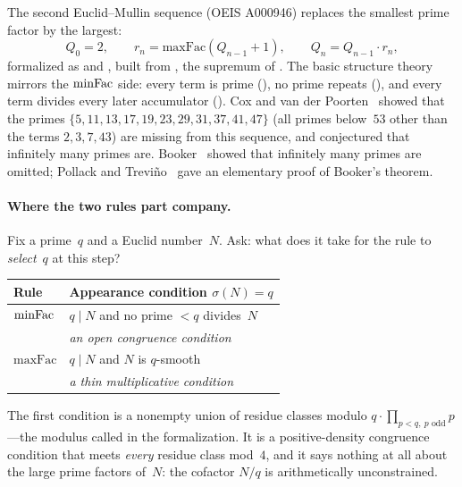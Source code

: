 The second Euclid--Mullin sequence (OEIS A000946) replaces the smallest
prime factor by the largest:
\[
  Q_0 = 2, \qquad
  r_n = \mathrm{maxFac}(Q_{n-1}+1), \qquad
  Q_n = Q_{n-1} \cdot r_n ,
\]
formalized as
 and
, built from
,
the supremum of .  The basic structure theory
mirrors the $\mathrm{minFac}$ side: every term is prime
(), no prime repeats
(), and every term
divides every later accumulator
().
Cox and van der Poorten~\cite{CoxVdP1968} showed that the primes
$\{5, 11, 13, 17, 19, 23, 29, 31, 37, 41, 47\}$ (all primes below~$53$
other than the terms $2,3,7,43$) are missing from this sequence, and
conjectured that infinitely many primes are.  Booker~\cite{Booker2012} showed that infinitely many primes are
omitted; Pollack and Treviño~\cite{PollackTrevino2014} gave an
elementary proof of Booker's theorem.

\paragraph{Where the two rules part company.}
Fix a prime~$q$ and a Euclid number~$N$.  Ask: what does it take for
the rule to \emph{select}~$q$ at this step?

\smallskip
\begin{center}
\begin{tabular}{@{}l@{\quad}l@{}}
\toprule
\textbf{Rule} & \textbf{Appearance condition} $\sigma(N) = q$ \\
\midrule
$\mathrm{minFac}$
  & $q \mid N$ and no prime $< q$ divides~$N$ \\
  & \emph{an open congruence condition} \\[0.4em]
$\mathrm{maxFac}$
  & $q \mid N$ and $N$ is $q$-smooth \\
  & \emph{a thin multiplicative condition} \\
\bottomrule
\end{tabular}
\end{center}

\smallskip\noindent
The first condition is a nonempty union of residue classes modulo
$q \cdot \prod_{p < q,\ p \text{ odd}} p$---the modulus called
 in the
formalization.  It is a positive-density congruence condition that meets
\emph{every} residue class mod~$4$, and it says nothing at all about the
large prime factors of~$N$: the cofactor $N/q$ is arithmetically
unconstrained.

